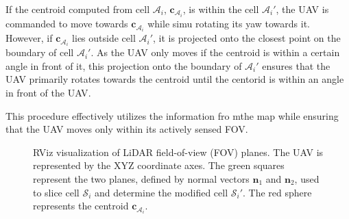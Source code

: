             If the centroid computed from cell $\mathcal{A}_i$, $\mathbf{c}_{\mathcal{A}_i}$, is within the cell $\mathcal{A}_i'$, the \ac{UAV} is commanded to move towards $\mathbf{c}_{\mathcal{A}_i}$ while simu rotating its yaw towards it.
            However, if $\mathbf{c}_{\mathcal{A}_i}$ lies outside cell $\mathcal{A}_i'$, it is projected onto the closest point on the boundary of cell $\mathcal{A}_i'$.
            As the \ac{UAV} only moves if the centroid is within a certain angle in front of it, this projection onto the boundary of $\mathcal{A}_i'$ ensures that the \ac{UAV} primarily rotates towards the centroid until the centorid is within an angle in front of the \ac{UAV}.

            This procedure effectively utilizes the information fro mthe map while ensuring that the \ac{UAV} moves only within its actively sensed \ac{FOV}.

            \begin{figure}[H]
                \centering
                \caption{
                    RViz visualization of LiDAR field-of-view (FOV) planes. The UAV is represented by the XYZ coordinate axes. 
                    The green squares represent the two planes, defined by normal vectors $\mathbf{n}_1$ and $\mathbf{n}_2$, used to slice cell $\mathcal{S}_i$ and determine the modified cell $\mathcal{S}_i'$.
                    The red sphere represents the centroid $\mathbf{c}_{\mathcal{A}_i}$.
                }
                \label{fig:cell_a_sliced}
            \end{figure}



